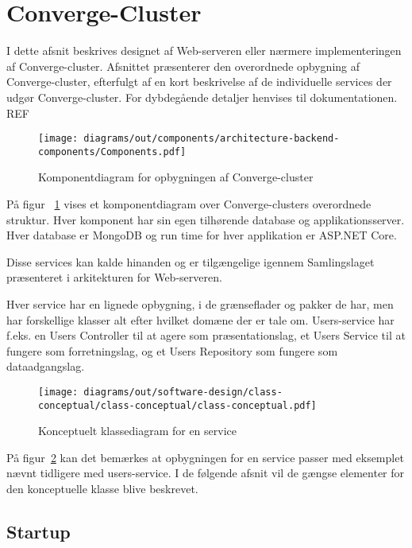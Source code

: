 \section{Converge-Cluster}

I dette afsnit beskrives designet af Web-serveren eller nærmere implementeringen af Converge-cluster. Afsnittet præsenterer den overordnede opbygning af Converge-cluster, efterfulgt af en kort beskrivelse af de individuelle services der udgør Converge-cluster. For dybdegående detaljer henvises til dokumentationen. REF

\begin{figure}[H]
  \centering
\texttt{[image: diagrams/out/components/architecture-backend-components/Components.pdf]}
\caption{Komponentdiagram for opbygningen af Converge-cluster}
\label{fig:component-converge-cluster}
\end{figure}

På figur ~\ref{fig:component-converge-cluster} vises et komponentdiagram over Converge-clusters overordnede struktur. Hver komponent har sin egen tilhørende database og applikationsserver. Hver database er MongoDB og run time for hver applikation er ASP.NET Core.

Disse services kan kalde hinanden og er tilgængelige igennem Samlingslaget præsenteret i arkitekturen for Web-serveren.

Hver service har en lignede opbygning, i de grænseflader og pakker de har, men har forskellige klasser alt efter hvilket domæne der er tale om. Users-service har f.eks. en Users Controller til at agere som præsentationslag, et Users Service til at fungere som forretningslag, og et Users Repository som fungere som dataadgangslag.

\begin{figure}[H]
  \centering
\texttt{[image: diagrams/out/software-design/class-conceptual/class-conceptual/class-conceptual.pdf]}
\caption{Konceptuelt klassediagram for en service}
\label{fig:conceptual-class-service}
\end{figure}

På figur~\ref{fig:conceptual-class-service} kan det bemærkes at opbygningen for en service passer med eksemplet nævnt tidligere med users-service. I de følgende afsnit vil de gængse elementer for den konceptuelle klasse blive beskrevet.

\subsection{Startup}

